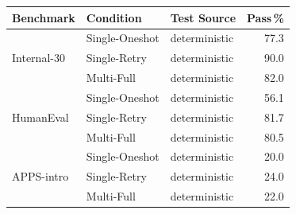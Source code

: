 \begin{tabular}{@{}lllr@{}}
\toprule
Benchmark & Condition & Test Source & Pass\,\% \\
\midrule
\multirow{3}{*}{Internal-30} & Single-Oneshot & deterministic & 77.3 \\
& Single-Retry & deterministic & 90.0 \\
& Multi-Full & deterministic & 82.0 \\
\midrule
\multirow{3}{*}{HumanEval} & Single-Oneshot & deterministic & 56.1 \\
& Single-Retry & deterministic & 81.7 \\
& Multi-Full & deterministic & 80.5 \\
\midrule
\multirow{3}{*}{APPS-intro} & Single-Oneshot & deterministic & 20.0 \\
& Single-Retry & deterministic & 24.0 \\
& Multi-Full & deterministic & 22.0 \\
\bottomrule
\end{tabular}
